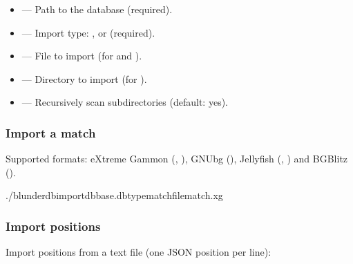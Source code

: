 \documentclass[letterpaper,10pt,english]{sphinxmanual}
\begin{document}
\sphinxAtStartPar
{}
\begin{itemize}
\item {} 
\sphinxAtStartPar
{} — Path to the database (required).

\item {} 
\sphinxAtStartPar
{} — Import type: ,  or  (required).

\item {} 
\sphinxAtStartPar
{} — File to import (for  and ).

\item {} 
\sphinxAtStartPar
{} — Directory to import (for ).

\item {} 
\sphinxAtStartPar
{} — Recursively scan subdirectories (default: yes).

\end{itemize}


\subsubsection{Import a match}
\label{\detokenize{cli:import-d-un-match}}
\sphinxAtStartPar
Supported formats: eXtreme Gammon (, ), GNUbg (), Jellyfish (, ) and BGBlitz ().

\begin{sphinxVerbatim}[commandchars=\\\{\}]
./blunderdbimport\PYGZhy{}\PYGZhy{}dbbase.db\PYGZhy{}\PYGZhy{}typematch\PYGZhy{}\PYGZhy{}filematch.xg
\end{sphinxVerbatim}


\subsubsection{Import positions}
\label{\detokenize{cli:import-de-positions}}
\sphinxAtStartPar
Import positions from a text file (one JSON position per line):
\end{document}
